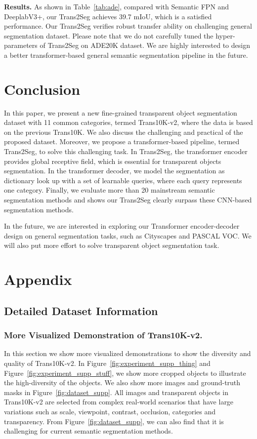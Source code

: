 \documentclass{article}
\begin{document}
\textbf{Results.}
As shown in Table~\ref{tab:ade}, compared with Semantic FPN and DeeplabV3+, our Trans2Seg achieves 39.7 mIoU, which is a satisfied performance. 
Our Trans2Seg verifies robust transfer ability on challenging general segmentation dataset.
Please note that we do not carefully tuned the hyper-parameters of Trans2Seg on ADE20K dataset. 
We are highly interested to design a better transformer-based general semantic segmentation pipeline in the future.





\section{Conclusion}
In this paper, we present a new fine-grained transparent object segmentation dataset with 11 common categories, termed Trans10K-v2, where the data is based on the previous Trans10K. We also discuss the challenging and practical of the proposed dataset. 
Moreover, we propose a transformer-based pipeline, termed Trans2Seg, to solve this challenging task. In Trans2Seg, the transformer encoder provides global receptive field, which is essential for transparent objects segmentation. In the transformer decoder, we model the segmentation as dictionary look up with a set of learnable queries, where each query represents one category. 
Finally, we evaluate more than 20 mainstream semantic segmentation methods and shows our Trans2Seg clearly surpass these CNN-based segmentation methods.

In the future, we are interested in exploring our Transformer encoder-decoder design on general segmentation tasks, such as Cityscapes and PASCAL VOC. We will also put more effort to solve transparent object segmentation task.

\clearpage

\section{Appendix}
\subsection{Detailed Dataset Information}
\subsubsection{More Visualized Demonstration of Trans10K-v2.}
In this section we show more visualized demonstrations to show the diversity and quality of Trans10K-v2. In
Figure~\ref{fig:experiment_supp_thing} and Figure~\ref{fig:experiment_supp_stuff}, we show more cropped objects to illustrate the high-diversity of the objects. We also show more images and ground-truth masks in Figure~\ref{fig:dataset_supp}. All images and transparent objects in Trans10K-v2 are selected from complex real-world scenarios that have large variations such as scale, viewpoint, contrast, occlusion, categories and transparency. From Figure~\ref{fig:dataset_supp}, we can also find that it is challenging for current semantic segmentation methods.
\end{document}
